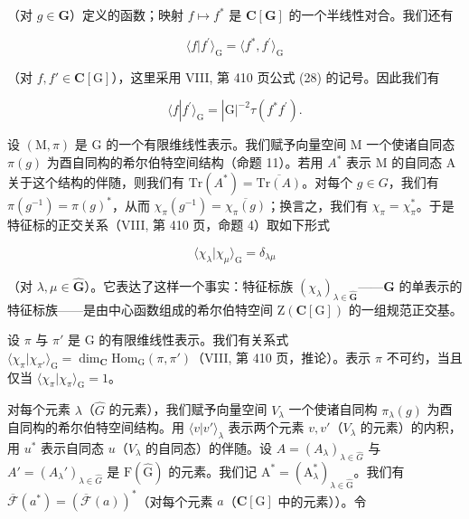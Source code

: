 （对 \(g \in \mathbf{G}\)）定义的函数；映射 \(f \mapsto f^*\) 是 \(\mathbf{C}[\mathbf{G}]\) 的一个半线性对合。我们还有

\[
\langle f | f ^ {\prime} \rangle_ {\mathrm{G}} = \langle f ^ {*}, f ^ {\prime} \rangle_ {\mathrm{G}}\tag{52}
\]

（对 \(f, f' \in \mathbf{C}[\mathrm{G}]\)），这里采用 VIII, 第 410 页公式 (28) 的记号。因此我们有

\[
\langle f | f ^ {\prime} \rangle_ {\mathrm{G}} = | \mathrm{G} | ^ {- 2} \tau (f ^ {*} f ^ {\prime}).\tag{53}
\]

设 \((\mathrm{M},\pi)\) 是 G 的一个有限维线性表示。我们赋予向量空间 M 一个使诸自同态 \(\pi(g)\) 为酉自同构的希尔伯特空间结构（命题 11）。若用 \(A^{*}\) 表示 M 的自同态 A 关于这个结构的伴随，则我们有 \(\mathrm{Tr}(A^{*})=\overline{\mathrm{Tr}(A)}\)。对每个 \(g\in G\)，我们有 \(\pi(g^{-1})=\pi(g)^{*}\)，从而 \(\chi_{\pi}(g^{-1})=\overline{\chi_{\pi}(g)}\)；换言之，我们有 \(\chi_{\pi}=\chi_{\pi}^{*}\)。于是特征标的正交关系（VIII, 第 410 页，命题 4）取如下形式

\[
\langle \chi_ {\lambda} | \chi_ {\mu} \rangle_ {\mathrm{G}} = \delta_ {\lambda \mu}\tag{54}
\]

（对 \(\lambda, \mu \in \widehat{\mathbf{G}}\)）。它表达了这样一个事实：特征标族 \((\chi_{\lambda})_{\lambda \in \widehat{\mathbf{G}}}\)——\(\mathbf{G}\) 的单表示的特征标族——是由中心函数组成的希尔伯特空间 \(\mathrm{Z}(\mathbf{C}[\mathrm{G}])\) 的一组规范正交基。

设 \(\pi\) 与 \(\pi'\) 是 G 的有限维线性表示。我们有关系式 \(\langle \chi_{\pi}|\chi_{\pi'}\rangle_{\mathrm{G}} = \dim_{\mathbf{C}}\mathrm{Hom}_{\mathrm{G}}(\pi, \pi')\)（VIII, 第 410 页，推论）。表示 \(\pi\) 不可约，当且仅当 \(\langle \chi_{\pi}|\chi_{\pi}\rangle_{\mathrm{G}} = 1\)。

对每个元素 \(\lambda\)（\(\widehat{G}\) 的元素），我们赋予向量空间 \(V_{\lambda}\) 一个使诸自同构 \(\pi_{\lambda}(g)\) 为酉自同构的希尔伯特空间结构。用 \(\langle v|v'\rangle_{\lambda}\) 表示两个元素 \(v, v'\)（\(V_{\lambda}\) 的元素）的内积，用 \(u^{*}\) 表示自同态 \(u\)（\(V_{\lambda}\) 的自同态）的伴随。设 \(A = (A_{\lambda})_{\lambda \in \widehat{G}}\) 与 \(A' = (A_{\lambda}')_{\lambda \in \widehat{G}}\) 是 \(\mathrm{F}(\widehat{\mathrm{G}})\) 的元素。我们记 \(\mathrm{A}^* = (\mathrm{A}_\lambda^*)_{\lambda \in \widehat{\mathrm{G}}}\)。我们有 \(\overline{\mathcal{F}} (a^{*}) = (\overline{\mathcal{F}} (a))^*\)（对每个元素 \(a\)（\(\mathbf{C}[\mathrm{G}]\) 中的元素））。令

